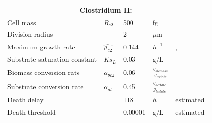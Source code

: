 \begin{table}
\begin{tabular}{|p{6cm}|p{1.2cm}|p{1.4cm}|p{1.5cm}|p{3cm}|}
        \multicolumn{5}{|c|}{\textbf{Clostridium II:}} \\
		\cline{1-5}
		Cell mass   & $ B_{c2}$&	500 & fg& \cite{kubitschek1990cell} \\ \cline{1-5}
		Division radius  & 	&2&$\mu$m &\cite{}\\ \cline{1-5}
		Maximum growth rate	& $\hat{\mu_{c2}}$ & 0.144& $h^{-1}$&\cite{}, \cite{} \\ \cline{1-5}
		Substrate saturation constant& $ Ks_{L} $ &	0.03&g/L&\cite{}  \\ \cline{1-5}
		Biomass conversion rate& $ \alpha_{bc2}$	&0.06& $\frac{g_{biomass}}{g_{lactate}}$&\cite{}  \\ \cline{1-5}
		Substrate conversion rate&$ \alpha_{al}$&	0.45& $\frac{g_{acetate}}{g_{lactate}}$&\cite{}  \\ \cline{1-5}
        Death delay&	&118 & $h$& estimated\\ \cline{1-5}
		Death threshold&	&0.00001 & g/L& estimated\\ \cline{1-5}
        	\end{tabular}
	\label{parametersTable}
\end{table}


